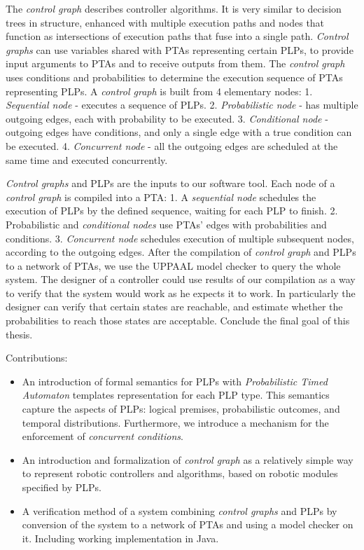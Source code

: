 \par The \textit{control graph} describes controller algorithms. It is very similar to decision trees in structure, enhanced with multiple execution paths and nodes that function as intersections of execution paths that fuse into a single path. \textit{Control graphs} can use variables shared with PTAs representing certain PLPs, to provide input arguments to PTAs and to receive outputs from them. The \textit{control graph} uses conditions and probabilities to determine the execution sequence of PTAs representing PLPs. A \textit{control graph} is built from 4 elementary nodes: 1. \textit{Sequential node} - executes a sequence of PLPs. 2. \textit{Probabilistic node} - has multiple outgoing edges, each with probability to be executed. 3. \textit{Conditional node} - outgoing edges have conditions, and only a single edge with a true condition can be executed. 4. \textit{Concurrent node} - all the outgoing edges are scheduled at the same time and executed concurrently. 
\par \textit{Control graphs} and PLPs are the inputs to our software tool. Each node of a \textit{control graph} is compiled into a PTA: 1. A \textit{sequential node} schedules the execution of PLPs by the defined sequence, waiting for each PLP to finish. 2. Probabilistic and \textit{conditional nodes} use PTAs’ edges with probabilities and conditions. 3. \textit{Concurrent node} schedules execution of multiple subsequent nodes, according to the outgoing edges. After the compilation of \textit{control graph} and PLPs to a network of PTAs, we use the UPPAAL model checker to query the whole system. The designer of a controller could use results of our compilation as a way to verify that the system would work as he expects it to work. In particularly the designer can verify that certain states are reachable, and estimate whether the probabilities to reach those states are acceptable. Conclude the final goal of this thesis.
\par Contributions:
\begin{itemize}
\item An introduction of formal semantics for PLPs with \textit{Probabilistic Timed Automaton} templates representation for each PLP type. This semantics capture the aspects of PLPs: logical premises, probabilistic outcomes, and temporal distributions. Furthermore, we introduce a mechanism for the enforcement of \textit{concurrent conditions}.
\item An introduction and formalization of \textit{control graph} as a relatively simple way to represent robotic controllers and algorithms, based on robotic modules specified by PLPs.
\item A verification method of a system combining \textit{control graphs} and PLPs by conversion of the system to a network of PTAs and using a model checker on it. Including working implementation in Java.
\end{itemize}
